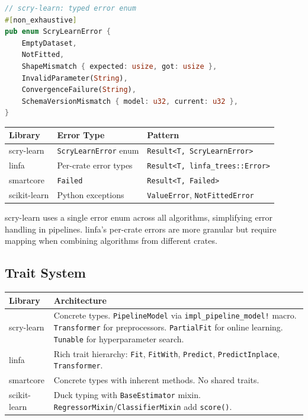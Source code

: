 \documentclass[11pt,a4paper]{article}
\begin{document}
\begin{lstlisting}[language=Rust]
// scry-learn: typed error enum
#[non_exhaustive]
pub enum ScryLearnError {
    EmptyDataset,
    NotFitted,
    ShapeMismatch { expected: usize, got: usize },
    InvalidParameter(String),
    ConvergenceFailure(String),
    SchemaVersionMismatch { model: u32, current: u32 },
}
\end{lstlisting}

\begin{center}
\begin{tabular}{lll}
\toprule
\textbf{Library} & \textbf{Error Type} & \textbf{Pattern} \\
\midrule
scry-learn & \texttt{ScryLearnError} enum & \texttt{Result<T, ScryLearnError>} \\
linfa & Per-crate error types & \texttt{Result<T, linfa\_trees::Error>} \\
smartcore & \texttt{Failed} & \texttt{Result<T, Failed>} \\
scikit-learn & Python exceptions & \texttt{ValueError}, \texttt{NotFittedError} \\
\bottomrule
\end{tabular}
\end{center}

scry-learn uses a single error enum across all algorithms, simplifying error handling in pipelines. linfa's per-crate errors are more granular but require mapping when combining algorithms from different crates.

\subsection{Trait System}

\begin{center}
\begin{tabular}{lp{10cm}}
\toprule
\textbf{Library} & \textbf{Architecture} \\
\midrule
scry-learn & Concrete types. \texttt{PipelineModel} via \texttt{impl\_pipeline\_model!} macro. \texttt{Transformer} for preprocessors. \texttt{PartialFit} for online learning. \texttt{Tunable} for hyperparameter search. \\
linfa & Rich trait hierarchy: \texttt{Fit}, \texttt{FitWith}, \texttt{Predict}, \texttt{PredictInplace}, \texttt{Transformer}. \\
smartcore & Concrete types with inherent methods. No shared traits. \\
scikit-learn & Duck typing with \texttt{BaseEstimator} mixin. \texttt{RegressorMixin}/\texttt{ClassifierMixin} add \texttt{score()}. \\
\bottomrule
\end{tabular}
\end{center}
\end{document}

